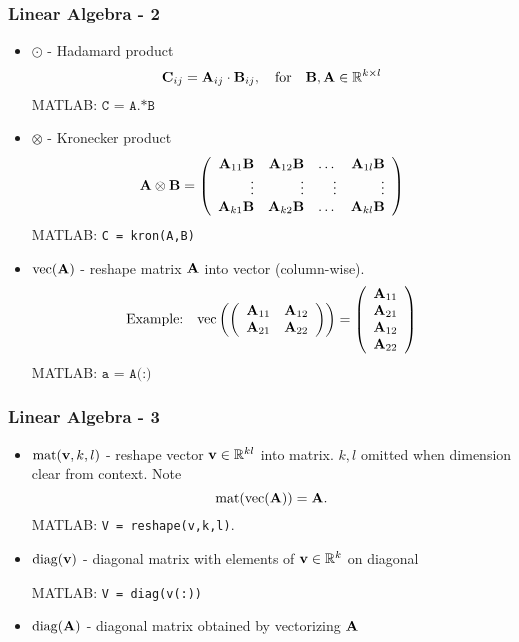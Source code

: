 \documentclass[12pt,fleqn]{beamer}
\begin{document}
\begin{frame}
	\frametitle{Linear Algebra - 2}
	\begin{itemize}
		\item $\odot$ - Hadamard product
		$$
			{\bf C}_{ij} = {\bf A}_{ij} \cdot {\bf B}_{ij}, \quad \text{for} \quad {\bf B},{\bf A} \in \mathbb{R}^{k\times l}
		$$
		MATLAB: $\texttt{C = A.*B}$
		\item $\otimes$ - Kronecker product
		$$
			{\bf A} \otimes {\bf B} = \left(
				\begin{array}{rrrrr}
					{\bf A}_{11} {\bf B} & {\bf A}_{12} {\bf B} & \dots & {\bf A}_{1l} {\bf B} \\
					\vdots         & \vdots         & \vdots& \vdots\\
					{\bf A}_{k1} {\bf B} & {\bf A}_{k2} {\bf B} & \dots & {\bf A}_{kl} {\bf B} \\
				\end{array}
			\right)
		$$
		MATLAB: \texttt{C = kron(A,B)}
		\item ${\rm vec}({\bf A})$ - reshape matrix ${\bf A}$ into vector (column-wise). 
		$$
		\text{Example:}\quad
			{\rm vec}\left(
				\left(
					\begin{array}{rr}
						{\bf A}_{11} & {\bf A}_{12} \\
						{\bf A}_{21} & {\bf A}_{22} 
					\end{array}
				\right)
			\right) = \left( 
				\begin{array}{r}
					{\bf A}_{11}\\
					{\bf A}_{21} \\
					{\bf A}_{12}\\
					{\bf A}_{22}
				\end{array}
			\right)
		$$
		MATLAB: $\texttt{a = A(:)}$
	\end{itemize}
\end{frame}


\begin{frame}
	\frametitle{Linear Algebra - 3}
	\begin{itemize}
		\item ${\rm mat}({\bf v},k,l)$ - reshape vector ${\bf v}\in\mathbb{R}^{kl}$ into matrix. $k,l$ omitted when dimension clear from context. Note
		$$
			{\rm mat}({\rm vec} ({\bf A})) = {\bf A}.
		$$
		MATLAB: \texttt{V = reshape(v,k,l)}.
	
		\item ${\rm diag}({\bf v})$ - diagonal matrix with elements of ${\bf v} \in \mathbb{R}^k$ on diagonal
		
		MATLAB: \texttt{V = diag(v(:))}
		
		\item ${\rm diag}({\bf A})$ - diagonal matrix obtained by vectorizing ${\bf A}$
	\end{itemize}
\end{frame}
\end{document}

